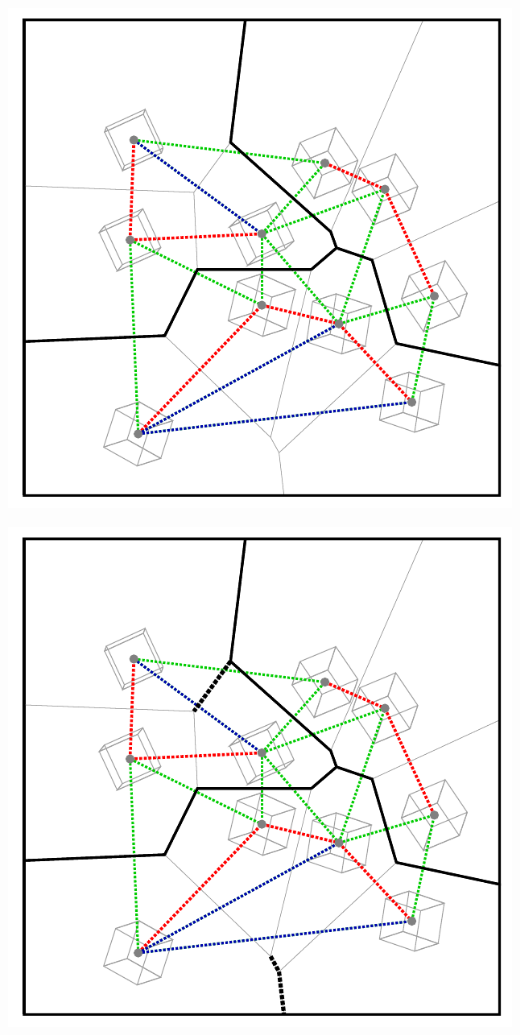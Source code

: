 \begin{frame}[fragile]
\begin{overprint}
\begin{center}
\includegraphics[height=0.9\textheight]{fig/voronoi-iom-adpmgs}
\par\end{center}


\begin{center}
\includegraphics[height=0.9\textheight]{fig/voronoi-iom-adpmgsb}
\par\end{center}



\end{overprint}
\end{frame}
